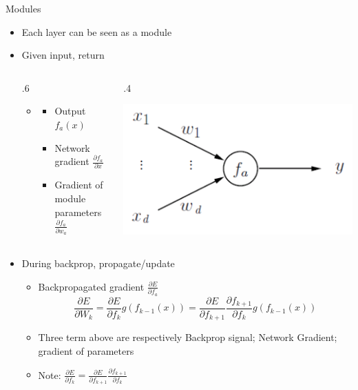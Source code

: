 \documentclass[12pt,notes,mathserif]{beamer}
\newcommand{\begincols}[1]{\begin{column}{#1}}
\newcommand{\stopcols}{\end{column}}
\newcommand{\pp}[2]{\frac{\partial #1}{\partial #2}}
\providecommand{\tightlist}{%
	\setlength{\itemsep}{0pt}\setlength{\parskip}{0pt}}
\begin{document}
\begin{frame}{Modules}

\begin{itemize}
\tightlist
\item
  Each layer can be seen as a module
\item
  Given input, return

  \begin{columns}
  \begincols{.6\textwidth}
  \begin{itemize}
      \item \begin{itemize}
          \item  Output $f_{a}(x)$
          \item   Network gradient $\frac{\partial f_{a}}{\partial x}$
          \item  Gradient of module parameters $\frac{\partial f_{a}}{\partial w_a}$
      \end{itemize}
  \end{itemize}
  \stopcols
  \begincols{.4\textwidth}
  \begin{center}
      \includegraphics[width=\textwidth]{2018-04-15-13-09-43.png}
  \end{center}
  \stopcols
  \end{columns}
\item
  During backprop, propagate/update

  \begin{itemize}
  \tightlist
  \item
    Backpropagated gradient \(\frac{\partial E}{\partial f_{a}}\)
    \[\frac{\partial E}{\partial W_{k}}=\frac{\partial E}{\partial f_{k}} g(f_{k-1}( x))=\frac{\partial E}{\partial f_{k + 1} }\pp{f_{k+1}}{f_k}g(f_{k-1}(x))\]
  \item
    Three term above are respectively Backprop signal; Network Gradient;
    gradient of parameters
  \item
    Note:
    \(\frac{\partial E}{\partial f_{k}}=\pp{E}{f_{k+1}} \pp{f_{k+1}}{{f_k}}\)
  \end{itemize}
\end{itemize}

\end{frame}
\end{document}
